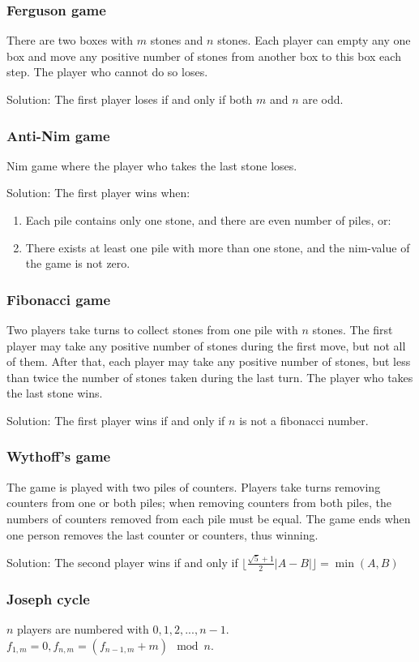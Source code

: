 \subsubsection{Ferguson game}
There are two boxes with $m$ stones and $n$ stones. Each player can empty any one box and move any positive number of stones from another box to this box each step. The player who cannot do so loses. 

Solution: The first player loses if and only if both $m$ and $n$ are odd.

\subsubsection{Anti-Nim game}
Nim game where the player who takes the last stone loses.

Solution: The first player wins when:

\begin{enumerate}

\item Each pile contains only one stone, and there are even number of piles, or:

\item There exists at least one pile with more than one stone, and the nim-value of the game is not zero.

\end{enumerate}

\subsubsection{Fibonacci game}

Two players take turns to collect stones from one pile with $n$ stones. The first player may take any positive number of stones during the first move, but not all of them. After that, each player may take any positive number of stones, but less than twice the number of stones taken during the last turn. The player who takes the last stone wins.

Solution: The first player wins if and only if $n$ is not a fibonacci number.

\subsubsection{Wythoff's game}
The game is played with two piles of counters. Players take turns removing counters from one or both piles; when removing counters from both piles, the numbers of counters removed from each pile must be equal. The game ends when one person removes the last counter or counters, thus winning.

Solution: The second player wins if and only if $\lfloor \frac{\sqrt{5}+1}{2}|A-B| \rfloor=\min(A,B)$

\subsubsection{Joseph cycle}
$n$ players are numbered with $0,1,2,...,n-1$. $f_{1,m}=0,f_{n,m}=(f_{n-1,m}+m)\mod n$. 

